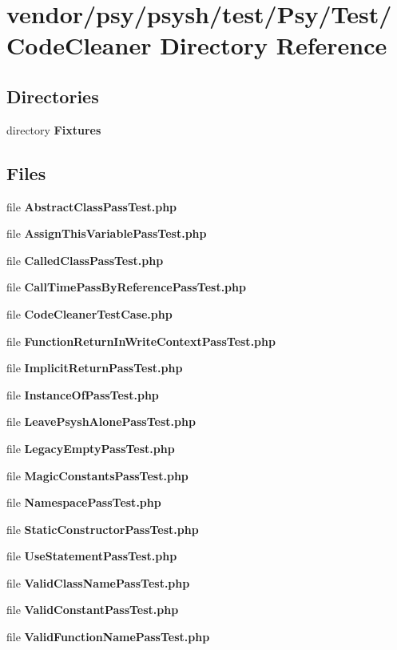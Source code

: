 \section{vendor/psy/psysh/test/\+Psy/\+Test/\+Code\+Cleaner Directory Reference}
\label{dir_e6074891ea0c481b63c691df0da46b11}
\subsection*{Directories}
\begin{DoxyCompactItemize}
\item 
directory {\bf Fixtures}
\end{DoxyCompactItemize}
\subsection*{Files}
\begin{DoxyCompactItemize}
\item 
file {\bf Abstract\+Class\+Pass\+Test.\+php}
\item 
file {\bf Assign\+This\+Variable\+Pass\+Test.\+php}
\item 
file {\bf Called\+Class\+Pass\+Test.\+php}
\item 
file {\bf Call\+Time\+Pass\+By\+Reference\+Pass\+Test.\+php}
\item 
file {\bf Code\+Cleaner\+Test\+Case.\+php}
\item 
file {\bf Function\+Return\+In\+Write\+Context\+Pass\+Test.\+php}
\item 
file {\bf Implicit\+Return\+Pass\+Test.\+php}
\item 
file {\bf Instance\+Of\+Pass\+Test.\+php}
\item 
file {\bf Leave\+Psysh\+Alone\+Pass\+Test.\+php}
\item 
file {\bf Legacy\+Empty\+Pass\+Test.\+php}
\item 
file {\bf Magic\+Constants\+Pass\+Test.\+php}
\item 
file {\bf Namespace\+Pass\+Test.\+php}
\item 
file {\bf Static\+Constructor\+Pass\+Test.\+php}
\item 
file {\bf Use\+Statement\+Pass\+Test.\+php}
\item 
file {\bf Valid\+Class\+Name\+Pass\+Test.\+php}
\item 
file {\bf Valid\+Constant\+Pass\+Test.\+php}
\item 
file {\bf Valid\+Function\+Name\+Pass\+Test.\+php}
\end{DoxyCompactItemize}
